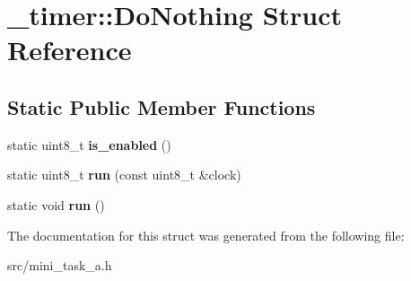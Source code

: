 \hypertarget{struct__timer_1_1DoNothing}{}\section{\+\_\+timer\+:\+:Do\+Nothing Struct Reference}
\label{struct__timer_1_1DoNothing}
\subsection*{Static Public Member Functions}
\begin{DoxyCompactItemize}
\item 
\hypertarget{struct__timer_1_1DoNothing_a1e99673fc42cee7d2862ea7dc8a49213}{}\label{struct__timer_1_1DoNothing_a1e99673fc42cee7d2862ea7dc8a49213} 
static uint8\+\_\+t {\bfseries is\+\_\+enabled} ()
\item 
\hypertarget{struct__timer_1_1DoNothing_a3ed1e85f61c729d9417abc83a581b260}{}\label{struct__timer_1_1DoNothing_a3ed1e85f61c729d9417abc83a581b260} 
static uint8\+\_\+t {\bfseries run} (const uint8\+\_\+t \&clock)
\item 
\hypertarget{struct__timer_1_1DoNothing_ab7a05783499667494ae2c311d882852e}{}\label{struct__timer_1_1DoNothing_ab7a05783499667494ae2c311d882852e} 
static void {\bfseries run} ()
\end{DoxyCompactItemize}


The documentation for this struct was generated from the following file\+:\begin{DoxyCompactItemize}
\item 
src/mini\+\_\+task\+\_\+a.\+h\end{DoxyCompactItemize}
